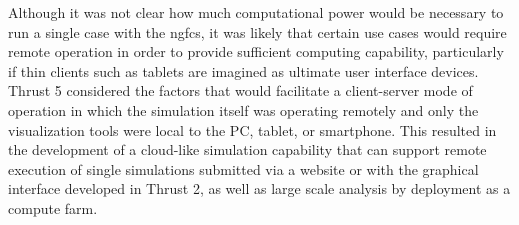 Although it was not clear how much computational power would be necessary to
run a single case with the \gls{ngfcs}, it was likely that certain use cases
would require remote operation in order to provide sufficient computing
capability, particularly if thin clients such as tablets are imagined as
ultimate user interface devices.  Thrust 5 considered the factors that would
facilitate a client-server mode of operation in which the simulation itself
was operating remotely and only the visualization tools were local to the PC,
tablet, or smartphone.  This resulted in the development of a cloud-like
simulation capability that can support remote execution of single simulations
submitted via a website or with the graphical interface developed in Thrust
2, as well as large scale analysis by deployment as a compute farm.


